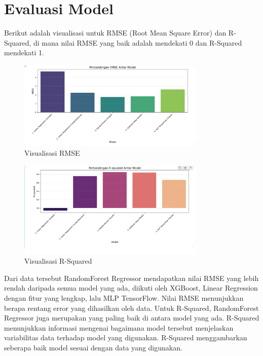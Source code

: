 \section{Evaluasi Model}

Berikut adalah visualisasi untuk RMSE (Root Mean Square Error) dan R-Squared, di mana nilai RMSE yang baik adalah mendekati 0 dan R-Squared 
mendekati 1.

\begin{figure}[h]
    \centering
    \includegraphics[width=0.8\textwidth]{images/rmse.png}
    \caption{Visualisasi RMSE}
    \label{fig:rmse}
\end{figure}

\begin{figure}[h]
    \centering
    \includegraphics[width=0.8\textwidth]{images/r-squared.png}
    \caption{Visualisasi R-Squared}
    \label{fig:rsquared}
\end{figure}

Dari data tersebut RandomForest Regressor mendapatkan nilai RMSE yang lebih rendah daripada semua model yang ada, diikuti oleh XGBoost, 
Linear Regression dengan fitur yang lengkap, lalu MLP TensorFlow. Nilai RMSE menunjukkan berapa rentang error yang dihasilkan oleh data. 
Untuk R-Squared, RandomForest Regressor juga merupakan yang paling baik di antara model yang ada. R-Squared menunjukkan informasi mengenai 
bagaimana model tersebut menjelaskan variabilitas data terhadap model yang digunakan. R-Squared menggambarkan seberapa baik model sesuai 
dengan data yang digunakan.

